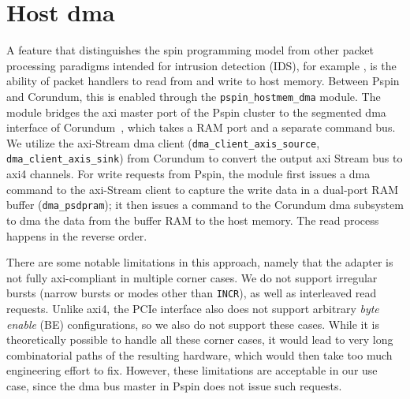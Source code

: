 
\section{Host \acs{dma}}

A feature that distinguishes the \ac{spin} programming model from other packet processing paradigms intended for intrusion detection (IDS), for example \cite{khazraee_rosebud_2023}, is the ability of packet handlers to read from and write to host memory.  Between P\acs{spin} and Corundum, this is enabled through the \texttt{pspin\_hostmem\_dma} module.  The module bridges the \ac{axi} master port of the P\acs{spin} cluster to the segmented \ac{dma} interface of Corundum~\cite{forencich_verilog_2023}, which takes a RAM port and a separate command bus.  We utilize the \ac{axi}-Stream \ac{dma} client (\texttt{dma\_\-client\_\-axis\_\-source}, \texttt{dma\_\-client\_\-axis\_\-sink}) from Corundum to convert the output \ac{axi} Stream bus to \ac{axi}4 channels.  For write requests from P\acs{spin}, the module first issues a \ac{dma} command to the \ac{axi}-Stream client to capture the write data in a dual-port RAM buffer (\texttt{dma\_\-psdpram}); it then issues a command to the Corundum \ac{dma} subsystem to \ac{dma} the data from the buffer RAM to the host memory.  The read process happens in the reverse order.

There are some notable limitations in this approach, namely that the adapter is not fully \ac{axi}-compliant in multiple corner cases.  We do not support irregular bursts (narrow bursts or modes other than \texttt{INCR}), as well as interleaved read requests.  Unlike \ac{axi}4, the PCIe interface also does not support arbitrary \emph{byte enable} (BE) configurations, so we also do not support these cases.  While it is theoretically possible to handle all these corner cases, it would lead to very long combinatorial paths of the resulting hardware, which would then take too much engineering effort to fix.  However, these limitations are acceptable in our use case, since the \ac{dma} bus master in P\acs{spin} does not issue such requests.

